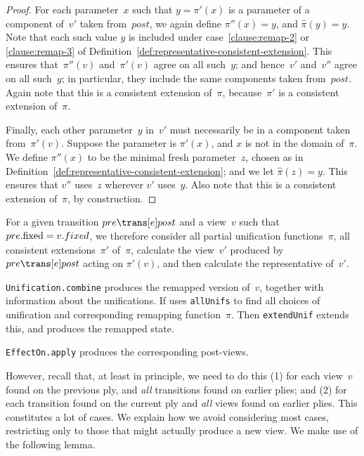 \begin{proof}
For each parameter~$x$ such that $y = \pi'(x)$ is a parameter of a component
of~$v'$ taken from~$post$, we again define $\pi''(x) = y$, and $\hat\pi(y) =
y$.  Note that each such value $y$ is included under
case~\ref{clause:remap-2} or \ref{clause:remap-3} of
Definition~\ref{def:representative-consistent-extension}.  This ensures
that~$\pi''(v)$ and~$\pi'(v)$ agree on all such~$y$; and hence~$v'$ and~$v''$
agree on all such~$y$; in particular, they include the same components taken
from~$post$.  Again note that this is a consistent extension of~$\pi$,
because~$\pi'$ is a consistent extension of~$\pi$. 

Finally, each other parameter~$y$ in~$v'$ must necessarily be in a component
taken from~$\pi'(v)$.  Suppose the parameter is $\pi'(x)$, and $x$ is not in
the domain of~$\pi$.  We define $\pi''(x)$ to be the minimal fresh
parameter~$z$, chosen as in
Definition~\ref{def:representative-consistent-extension}; and we let
$\hat\pi(z) = y$.  This ensures that $v''$ uses~$z$ wherever $v'$ uses~$y$.
Also note that this is a consistent extension of~$\pi$, by construction.
\end{proof}

For a given transition $pre \trans[e] post$ and a view~$v$ such that
$pre.\mathrm{fixed} = v.fixed$, we therefore consider all partial unification
functions~$\pi$, all consistent extensions~$\pi'$ of~$\pi$, calculate the
view~$v'$ produced by $pre \trans[e] post$ acting on $\pi'(v)$, and then
calculate the representative of~$v'$.


\begin{impNote}
\texttt{Unification.combine} produces the remapped version of~$v$, together
with information about the unifications.  If uses \texttt{allUnifs} to find
all choices of unification and corresponding remapping function~$\pi$.  Then
\texttt{extendUnif} extends this, and produces the remapped state.

\texttt{EffectOn.apply} produces the corresponding post-views.
\end{impNote}


However, recall that, at least in principle, we need to do this (1) for each
view~$v$ found on the previous ply, and \emph{all} transitions found on
earlier plies; and (2) for each transition found on the current ply and
\emph{all} views found on earlier plies.  This constitutes a lot of cases.  We
explain how we avoid considering most cases, restricting only to those that
might actually produce a new view.  We make use of the following lemma.

